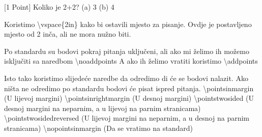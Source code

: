 \documentclass[addpoints,answers]{beamer}
\newcounter{points}
\newenvironment{questions}{\setcounter{points}{0}}{}
\newcommand{\question}[1][1]{\addtocounter{points}{#1}}
\begin{document}
\begin{frame}
\begin{questions} 
	\question[1]
 [1 Point] Koliko je 2+2?\newline
	(a) 3 \newline
	(b)	4 
\end{questions}
\end{frame}


\begin{frame}
	Koristimo
	\newline
	\newline
	\color{blue}
	\textbackslash{vspace\{2in\}} 
	\color{black}
	\newline
	\newline
	 kako bi ostavili mjesto za pisanje. Ovdje je postavljeno mjesto od 2 inča, ali ne mora nužno biti.
\end{frame}

\begin{frame}
	Po standardu su bodovi pokraj pitanja uključeni, ali ako mi želimo ih možemo isključiti sa naredbom
	\newline
	\newline
	\color{blue}
	\textbackslash{noaddpoints}
	\color{black}
	\newline
	\newline
	A ako ih želimo vratiti koristimo 
	\newline
	\newline
	\color{blue}
	\textbackslash{addpoints}
	\color{black}
\end{frame}

\begin{frame}
	Isto tako koristimo slijedeće naredbe da odredimo di će se bodovi nalazit. Ako ništa ne odredimo po standardu bodovi će pisat ispred pitanja.
	\newline
	\newline
	\color{blue}
	\textbackslash{pointsinmargin}
		\color{black}
	(U lijevoj margini)
		\color{blue}
	\newline
	\newline
	\textbackslash{pointsinrightmargin}
		\color{black}
	(U desnoj margini)
		\color{blue}
	\newline
	\newline
	\textbackslash{pointstwosided}
		\color{black}
	(U desnoj margini na neparnim, a u lijevoj na parnim stranicama)
		\color{blue}
	\newline
	\newline
	\textbackslash{pointstwosidedreversed}
		\color{black}
	(U lijevoj margini na neparnim, a u desnoj na parnim stranicama)
		\color{blue}
	\newline
	\newline
	\textbackslash{nopointsinmargin}\color{black}   (Da se vratimo na standard)
\end{frame}
\end{document}
